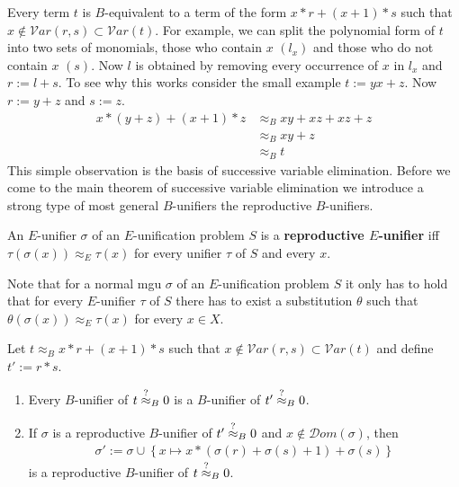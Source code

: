 		Every term $t$ is $B$-equivalent to a term of the form $x*r+(x+1)*s$ such that $x\notin\mathcal{V}ar(r,s)\subset\mathcal{V}ar(t)$. For example, we can split the polynomial form of $t$ into two sets of monomials, those who contain $x$  $\left(l_x\right)$ and those who do not contain $x$ $(s)$. Now $l$ is obtained by removing every occurrence of $x$ in $l_x$ and $r:=l+s$. To see why this works consider the small example $t:=yx+z$. Now $r:=y+z$ and $s:=z$.
		\begin{align*}
		x*(y+z)+(x+1)*z&\approx_B xy+xz+xz+z\\
		&\approx_B xy+z\\
		&\approx_B t
		\end{align*}
		This simple observation is the basis of successive variable elimination.
		Before we come to the main theorem of successive variable elimination we introduce a strong type of most general $B$-unifiers the reproductive $B$-unifiers.
		\begin{definition}
		An $E$-unifier $\sigma$ of an $E$-unification problem $S$ is a \textbf{reproductive $E$-unifier} iff $\tau(\sigma(x))\approx_E\tau(x)$ for every unifier $\tau$ of $S$ and every $x$.
		\end{definition}
		Note that for a normal mgu $\sigma$ of an $E$-unification problem $S$ it only has to hold that for every $E$-unifier $\tau$ of $S$ there has to exist a substitution $\theta$ such that $\theta(\sigma(x))\approx_E\tau(x)$ for every $x\in X$. 
		\begin{theorem}\label{sucVEli}
		Let $t\approx_B x*r+(x+1)*s$ such that $x\notin\mathcal{V}ar(r,s)\subset\mathcal{V}ar(t)$ and define $t':=r*s$.
		\begin{enumerate}
		\item Every $B$-unifier of $t\stackrel{?}{\approx}_B0$ is a $B$-unifier of $t'\stackrel{?}{\approx}_B0$.
		\item If $\sigma$ is a reproductive $B$-unifier of $t'\stackrel{?}{\approx}_B0$ and $x\notin\mathcal{D}om(\sigma)$, then 
		\begin{align*}
		\sigma':=\sigma\cup\left\lbrace x\mapsto x*(\sigma(r)+\sigma(s)+1)+\sigma(s)\right\rbrace
		\end{align*}
		is a reproductive $B$-unifier of $t\stackrel{?}{\approx}_B0$.
		\end{enumerate}
		\end{theorem}
